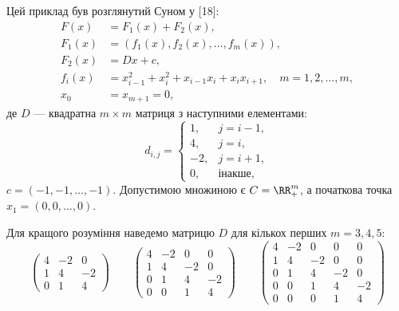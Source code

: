 Цей приклад був розглянутий Суном у [18]:
\begin{equation}
    \begin{aligned}
        F(x) &= F_1(x) + F_2(x), \\
        F_1(x) &= (f_1(x), f_2(x), \dots, f_m(x)), \\
        F_2(x) &= D x + c, \\
        f_i(x) &= x_{i - 1}^2 + x_i^2 + x_{i - 1} x_i + x_i x_{i + 1}, \quad m = 1, 2, \dots, m, \\
        x_0 &= x_{m + 1} = 0,
    \end{aligned}
\end{equation}
де $D$ --- квадратна $m \times m$ матриця з наступними елементами:
\begin{equation}
    d_{i,j} = \begin{cases}
         1, & j = i - 1, \\
         4, & j = i, \\
        -2, & j = i + 1, \\
         0, & \text{інакше},
    \end{cases}
\end{equation}
$c = (-1, -1, \dots, -1)$. Допустимою множиною є $C = \RR_+^m$, а початкова точка $x_1 = (0, 0, \dots, 0)$. \medskip

Для кращого розуміння наведемо матрицю $D$ для кількох перших $m = 3, 4, 5$:
\begin{equation}
    \begin{pmatrix}
        4 & -2 &  0 \\
        1 &  4 & -2 \\
        0 &  1 &  4
    \end{pmatrix}
    \qquad
    \begin{pmatrix}
        4 & -2 &  0 &  0 \\
        1 &  4 & -2 &  0 \\
        0 &  1 &  4 & -2 \\
        0 &  0 &  1 &  4
    \end{pmatrix}
    \qquad
    \begin{pmatrix}
        4 & -2 &  0 &  0 &  0 \\
        1 &  4 & -2 &  0 &  0 \\
        0 &  1 &  4 & -2 &  0 \\
        0 &  0 &  1 &  4 & -2 \\
        0 &  0 &  0 &  1 &  4
    \end{pmatrix}
\end{equation}

